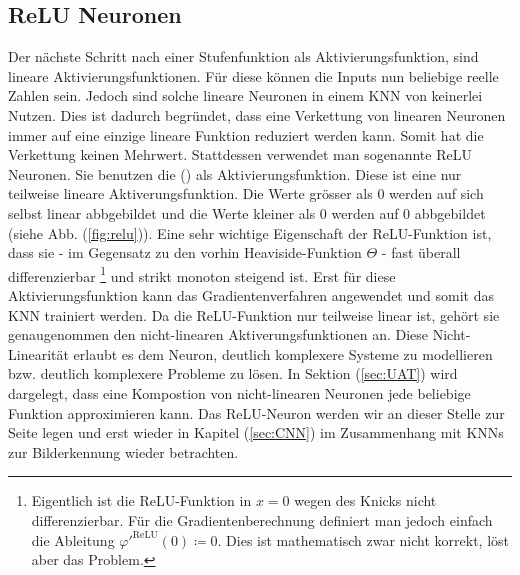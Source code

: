 \cite{wiki:kuenstliches_neuron}
\cite{wiki:perzeptron}


\subsection{ReLU Neuronen}\label{sec:ReLU}
Der nächste Schritt nach einer Stufenfunktion als Aktivierungsfunktion, sind
lineare Aktivierungsfunktionen. Für diese können die Inputs nun beliebige reelle
Zahlen sein.
Jedoch sind solche lineare Neuronen in einem KNN von keinerlei Nutzen.
Dies ist dadurch begründet, dass eine Verkettung von linearen Neuronen
immer auf eine einzige lineare Funktion reduziert werden kann. Somit hat
die Verkettung keinen Mehrwert.
\para{}
Stattdessen verwendet man sogenannte ReLU Neuronen. Sie benutzen die
 () als Aktivierungsfunktion.
Diese ist eine
nur teilweise lineare Aktiverungsfunktion. Die Werte grösser als 0 werden
auf sich selbst linear abbgebildet und die Werte kleiner als 0 werden auf 0
abbgebildet (siehe Abb. (\ref{fig:relu})).
Eine sehr wichtige Eigenschaft der ReLU-Funktion ist, dass sie - im Gegensatz zu den vorhin
Heaviside-Funktion $\Theta$ - fast überall differenzierbar%
\footnote{%
  Eigentlich ist die ReLU-Funktion in $x=0$ wegen des Knicks nicht
  differenzierbar. Für die Gradientenberechnung definiert man jedoch einfach
  die Ableitung $\varphi'^{\text{ReLU}}(0) \coloneqq 0$. Dies ist mathematisch zwar nicht
  korrekt, löst aber das Problem.
}%
und strikt monoton
steigend ist. Erst für diese Aktivierungsfunktion kann das Gradientenverfahren
angewendet und somit das KNN trainiert werden.
\para{}
Da die ReLU-Funktion nur teilweise linear ist, gehört sie genaugenommen den
nicht-linearen Aktiverungsfunktionen an. Diese Nicht-Linearität erlaubt es dem
Neuron, deutlich komplexere Systeme zu modellieren bzw. deutlich komplexere
Probleme zu lösen. In Sektion (\ref{sec:UAT}) wird dargelegt, dass
eine Kompostion von nicht-linearen Neuronen jede beliebige Funktion approximieren kann.
\para{}
Das ReLU-Neuron werden wir an dieser Stelle zur Seite legen und erst wieder in
Kapitel (\ref{sec:CNN}) im Zusammenhang mit KNNs zur Bilderkennung wieder betrachten.
\para{}
